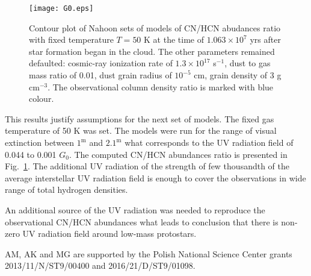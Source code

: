 \documentclass{aa}
\begin{document}
\begin{figure}
   \centering
   \texttt{[image: G0.eps]}
      \caption{Contour plot of Nahoon sets of models of CN/HCN abudances ratio with fixed temperature $T = 50$ K at the time of $1.063\times 10^{7}$ yrs after star formation began in the cloud. The other parameters remained defaulted: cosmic-ray ionization rate of $1.3\times 10^{17}$ s$^{-1}$, dust to gas mass ratio of 0.01, dust grain radius of $10^{-5}$ cm, grain density of 3 g cm$^{-3}$. The observational column density ratio is marked with blue colour.}
         \label{G0}
   \end{figure}

This results justify assumptions for the next set of models. The fixed gas temperature of 50 K was set. The models were run for the range of visual extinction between $1^{\mathrm{m}}$ and $2.1^{\mathrm{m}}$ what corresponds to the UV radiation field of 0.044 to 0.001 $G_0$. The computed CN/HCN abundances ratio is presented in Fig.~\ref{G0}. The additional UV radiation of the strength of few thousandth of the average interstellar UV radiation field is enough to cover the observations in wide range of total hydrogen densities. 

An additional source of the UV radiation was needed to reproduce the observational CN/HCN abundances what leads to conclusion that there is non-zero UV radiation field around low-mass protostars. 

\begin{acknowledgements}
AM, AK and MG are supported by the Polish National Science Center grants 2013/11/N/ST9/00400 and 2016/21/D/ST9/01098. 
\end{acknowledgements}

%
%
\end{document}
